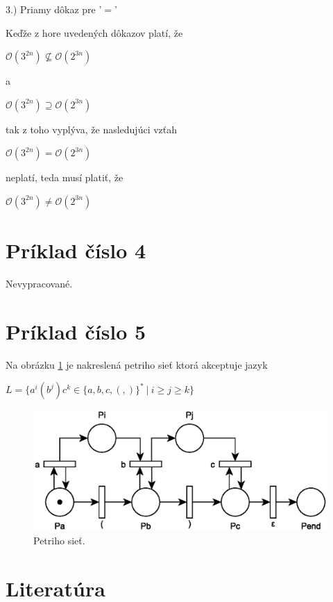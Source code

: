 \documentclass[11pt,a4paper]{article}
\begin{document}
\hspace{5mm}3.) Priamy dôkaz pre '$=$'

\begin{flushright}
\begin{minipage}{0.92\textwidth}
  Keďže z hore uvedených dôkazov platí, že
  \begin{center}
    $\mathcal{O}(3^{2n}) \nsubseteq \mathcal{O}(2^{3n})$
  \end{center}
  a
  \begin{center}
    $\mathcal{O}(3^{2n}) \supseteq \mathcal{O}(2^{3n})$
  \end{center}
  tak z toho vyplýva, že nasledujúci vzťah
  \begin{center}
    $\mathcal{O}(3^{2n}) = \mathcal{O}(2^{3n})$
  \end{center}
  neplatí, teda musí platiť, že
  \begin{center}
    $\mathcal{O}(3^{2n}) \neq \mathcal{O}(2^{3n})$
  \end{center}
\end{minipage}
\end{flushright}

\newpage
\section{Príklad číslo 4}

Nevypracované.

\newpage
\section{Príklad číslo 5}

Na obrázku \ref{fig:pn} je nakreslená petriho sieť ktorá akceptuje jazyk

\begin{center}
$L = \{a^i(b^j)c^k \in \{a,b,c,(,)\}^* \ | \ i \geq j \geq k\}$
\end{center}

\begin{figure}[H]
  \centering
  \includegraphics[scale=1]{img/pn.eps}
  \caption{Petriho sieť.}
  \label{fig:pn}
\end{figure}


\newpage
\section{Literatúra}

\begin{flushleft}
    
\end{flushleft}
\end{document}
